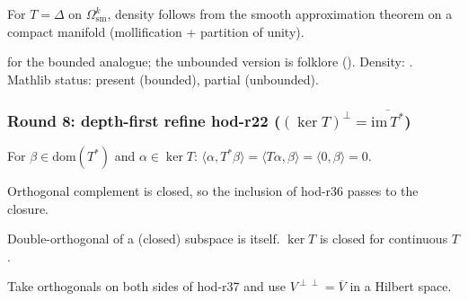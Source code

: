 \begin{lemma}
\label{lem:hod-r34}
For $T=\Delta$ on $\Omega^{k}_{\mathrm{sm}}$, density follows from the smooth approximation theorem on a compact manifold (mollification + partition of unity).
\leanok
\end{lemma}

\begin{lemma}
\label{lem:hod-r35}
 for the bounded analogue; the unbounded version is folklore ().  Density: .  Mathlib status: present (bounded), partial (unbounded).
\leanok\mathlibok
\end{lemma}

\subsubsection*{Round 8: depth-first refine hod-r22 ($(\ker T)^{\perp} = \overline{\mathrm{im}\,T^{*}}$)}

\begin{lemma}
\label{lem:hod-r36}
For $\beta\in\mathrm{dom}(T^{*})$ and $\alpha\in\ker T$: $\langle\alpha,T^{*}\beta\rangle = \langle T\alpha,\beta\rangle = \langle 0,\beta\rangle = 0$.
\leanok\mathlibok
\end{lemma}

\begin{lemma}
\label{lem:hod-r37}
Orthogonal complement is closed, so the inclusion of hod-r36 passes to the closure.
\leanok\mathlibok
\end{lemma}

\begin{lemma}[Pass hod.38: $((\ker T)^{\perp})^{\perp} = \overline{\ker T}$]
\label{lem:hod-r38}
Double-orthogonal of a (closed) subspace is itself.  $\ker T$ is closed for continuous $T$.
\leanok\mathlibok
\end{lemma}

\begin{lemma}[Pass hod.39: $(\overline{\mathrm{im}\,T^{*}})^{\perp} = \ker T$]
\label{lem:hod-r39}
Take orthogonals on both sides of hod-r37 and use $V^{\perp\perp}=\overline{V}$ in a Hilbert space.
\leanok\mathlibok
\end{lemma}

